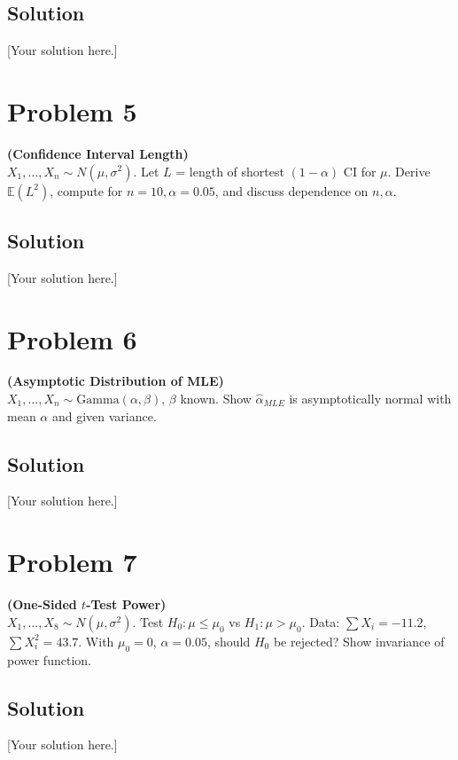 \documentclass[12pt]{article}
\newcommand{\E}{\mathbb{E}}
\begin{document}
\subsection*{Solution}
[Your solution here.]

\newpage
\section*{Problem 5}
\textbf{(Confidence Interval Length)} \\
$X_1,\dots,X_n \sim N(\mu,\sigma^2)$. Let $L$ = length of shortest $(1-\alpha)$ CI for $\mu$. Derive $\E(L^2)$, compute for $n=10,\alpha=0.05$, and discuss dependence on $n,\alpha$.

\subsection*{Solution}
[Your solution here.]

\newpage
\section*{Problem 6}
\textbf{(Asymptotic Distribution of MLE)} \\
$X_1,\dots,X_n \sim \text{Gamma}(\alpha,\beta)$, $\beta$ known. Show $\hat{\alpha}_{MLE}$ is asymptotically normal with mean $\alpha$ and given variance.

\subsection*{Solution}
[Your solution here.]

\newpage
\section*{Problem 7}
\textbf{(One-Sided $t$-Test Power)} \\
$X_1,\dots,X_8 \sim N(\mu,\sigma^2)$. Test $H_0:\mu \leq \mu_0$ vs $H_1:\mu > \mu_0$. Data: $\sum X_i=-11.2$, $\sum X_i^2=43.7$. With $\mu_0=0$, $\alpha=0.05$, should $H_0$ be rejected? Show invariance of power function.

\subsection*{Solution}
[Your solution here.]

\newpage
\end{document}
